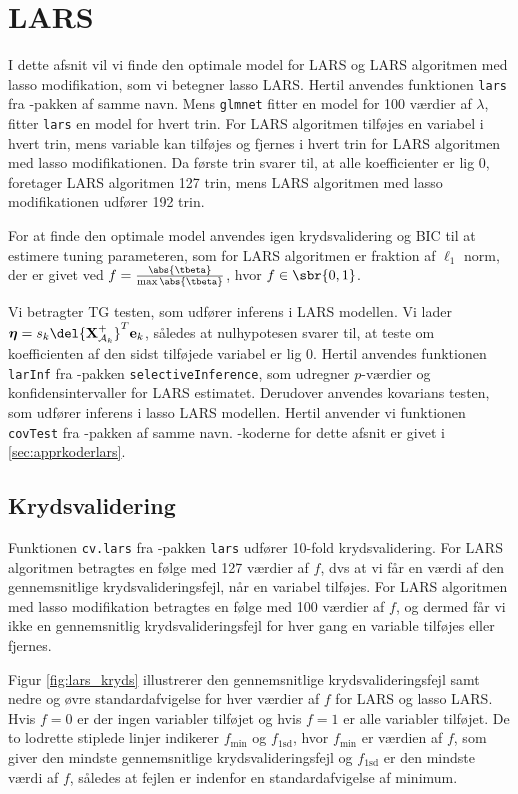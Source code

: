 \section{LARS}
I dette afsnit vil vi finde den optimale model for LARS og LARS algoritmen med lasso modifikation, som vi betegner lasso LARS. 
Hertil anvendes funktionen \texttt{lars} fra \Rlang-pakken af samme navn.
Mens \texttt{glmnet} fitter en model for 100 værdier af \(\lambda\), fitter \texttt{lars} en model for hvert trin.
For LARS algoritmen tilføjes en variabel i hvert trin, mens variable kan tilføjes og fjernes i hvert trin for LARS algoritmen med lasso modifikationen.
Da første trin svarer til, at alle koefficienter er lig 0, foretager LARS algoritmen 127 trin, mens LARS algoritmen med lasso modifikationen udfører 192 trin.

For at finde den optimale model anvendes igen krydsvalidering og BIC til at estimere tuning parameteren, som for LARS algoritmen er fraktion af \(\ell_1\) norm, der er givet ved \(f = \frac{\abs{\tbeta}}{\max \abs{\tbeta}}\), hvor \(f \in \sbr{0,1}\).

Vi betragter TG testen, som udfører inferens i LARS modellen.
Vi lader $\boldsymbol{\eta} = s_k \del{\textbf{X}^+_{\mathcal{A}_k}}^T \mathbf{e}_k$, således at nulhypotesen svarer til, at teste om koefficienten af den sidst tilføjede variabel er lig 0.
Hertil anvendes funktionen \texttt{larInf} fra \Rlang-pakken \texttt{selectiveInference}, som udregner \(p\)-værdier og konfidensintervaller for LARS estimatet.
Derudover anvendes kovarians testen, som udfører inferens i lasso LARS modellen.
Hertil anvender vi funktionen \texttt{covTest} fra \Rlang-pakken af samme navn. 
\Rlang-koderne for dette afsnit er givet i \ref{sec:apprkoderlars}.

\subsection{Krydsvalidering}
Funktionen \texttt{cv.lars} fra \Rlang-pakken \texttt{lars} udfører 10-fold krydsvalidering.
For LARS algoritmen betragtes en følge med 127 værdier af $f$, dvs at vi får en værdi af den gennemsnitlige krydsvalideringsfejl, når en variabel tilføjes.
For LARS algoritmen med lasso modifikation betragtes en følge med 100 værdier af $f$, og dermed får vi ikke en gennemsnitlig krydsvalideringsfejl for hver gang en variable tilføjes eller fjernes.

Figur \ref{fig:lars_kryds} illustrerer den gennemsnitlige krydsvalideringsfejl samt nedre og øvre standardafvigelse for hver værdier af $f$ for LARS og lasso LARS.
Hvis $f = 0$ er der ingen variabler tilføjet og hvis $f=1$ er alle variabler tilføjet. 
De to lodrette stiplede linjer indikerer \(f_{\text{min}}\) og \(f_\text{1sd}\), hvor \(f_{\text{min}}\) er værdien af \(f\), som giver den mindste gennemsnitlige krydsvalideringsfejl og \(f_\text{1sd}\) er den mindste værdi af \(f\), således at fejlen er indenfor en standardafvigelse af minimum. 


